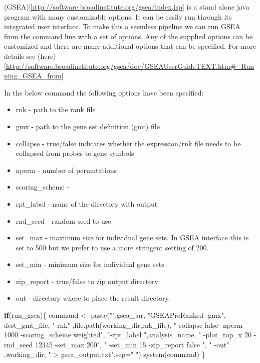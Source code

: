 \documentclass[
]{book}
\newenvironment{Shaded}{\begin{snugshade}}{\end{snugshade}}
\newcommand{\AttributeTok}[1]{\textcolor[rgb]{0.77,0.63,0.00}{#1}}
\newcommand{\ControlFlowTok}[1]{\textcolor[rgb]{0.13,0.29,0.53}{\textbf{#1}}}
\newcommand{\FunctionTok}[1]{\textcolor[rgb]{0.00,0.00,0.00}{#1}}
\newcommand{\NormalTok}[1]{#1}
\newcommand{\OtherTok}[1]{\textcolor[rgb]{0.56,0.35,0.01}{#1}}
\newcommand{\StringTok}[1]{\textcolor[rgb]{0.31,0.60,0.02}{#1}}
\providecommand{\tightlist}{%
  \setlength{\itemsep}{0pt}\setlength{\parskip}{0pt}}
\begin{document}
(GSEA){[}\url{http://software.broadinstitute.org/gsea/index.jsp}{]} is a stand alone java program with many customizable options. It can be easily run through its integrated user interface. To make this a seemless pipeline we can run GSEA from the command line with a set of options. Any of the supplied options can be customized and there are many additional options that can be specified. For more details see (here){[}\url{http://software.broadinstitute.org/gsea/doc/GSEAUserGuideTEXT.htm\#_Running_GSEA_from}{]}

In the below command the following options have been specified:

\begin{itemize}
\tightlist
\item
  rnk - path to the rank file
\item
  gmx - path to the gene set definition (gmt) file
\item
  collapse - true/false indicates whether the expression/rnk file needs to be collapsed from probes to gene symbols
\item
  nperm - number of permutations
\item
  scoring\_scheme -
\item
  rpt\_label - name of the directory with output
\item
  rnd\_seed - random seed to use
\item
  set\_max - maximum size for individual gene sets. In GSEA interface this is set to 500 but we prefer to use a more stringent setting of 200.
\item
  set\_min - minimum size for individual gene sets
\item
  zip\_report - true/false to zip output directory
\item
  out - directory where to place the result directory.
\end{itemize}

\begin{Shaded}
\begin{Highlighting}[]
\ControlFlowTok{if}\NormalTok{(run\_gsea)\{}
\NormalTok{  command }\OtherTok{\textless{}{-}} \FunctionTok{paste}\NormalTok{(}\StringTok{""}\NormalTok{,gsea\_jar,  }
                   \StringTok{"GSEAPreRanked {-}gmx"}\NormalTok{, dest\_gmt\_file, }
                   \StringTok{"{-}rnk"}\NormalTok{ ,}\FunctionTok{file.path}\NormalTok{(working\_dir,rnk\_file), }
                   \StringTok{"{-}collapse false {-}nperm 1000 {-}scoring\_scheme weighted"}\NormalTok{, }
                   \StringTok{"{-}rpt\_label "}\NormalTok{,analysis\_name,}
                   \StringTok{"  {-}plot\_top\_x 20 {-}rnd\_seed 12345  {-}set\_max 200"}\NormalTok{,  }
                   \StringTok{" {-}set\_min 15 {-}zip\_report false "}\NormalTok{,}
                   \StringTok{" {-}out"}\NormalTok{ ,working\_dir, }
                   \StringTok{" \textgreater{} gsea\_output.txt"}\NormalTok{,}\AttributeTok{sep=}\StringTok{" "}\NormalTok{)}
  \FunctionTok{system}\NormalTok{(command)}
\NormalTok{\}}
\end{Highlighting}
\end{Shaded}
\end{document}
